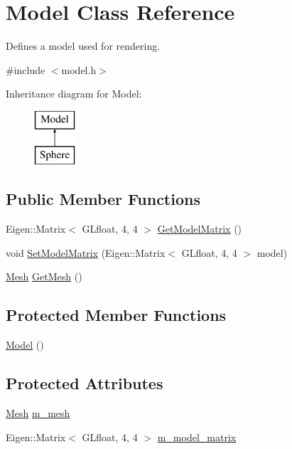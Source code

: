 \hypertarget{classModel}{}\section{Model Class Reference}
\label{classModel}


Defines a model used for rendering.  




{\ttfamily \#include $<$model.\+h$>$}

Inheritance diagram for Model\+:\begin{figure}[H]
\begin{center}
\leavevmode
\includegraphics[height=2.000000cm]{classModel}
\end{center}
\end{figure}
\subsection*{Public Member Functions}
\begin{DoxyCompactItemize}
\item 
Eigen\+::\+Matrix$<$ G\+Lfloat, 4, 4 $>$ \hyperlink{classModel_af37e550b25274838de666ddc7e2167d6}{Get\+Model\+Matrix} ()
\item 
void \hyperlink{classModel_a6b79c9e0c9abc50896e70fe1fabff4e7}{Set\+Model\+Matrix} (Eigen\+::\+Matrix$<$ G\+Lfloat, 4, 4 $>$ model)
\item 
\hyperlink{classMesh}{Mesh} \hyperlink{classModel_a332f5a4ecf9bca582e583b3ff7784bf5}{Get\+Mesh} ()
\end{DoxyCompactItemize}
\subsection*{Protected Member Functions}
\begin{DoxyCompactItemize}
\item 
\hyperlink{classModel_ae3b375de5f6df4faf74a95d64748e048}{Model} ()
\end{DoxyCompactItemize}
\subsection*{Protected Attributes}
\begin{DoxyCompactItemize}
\item 
\hyperlink{classMesh}{Mesh} \hyperlink{classModel_afe425f579d17b798e6c454a5c5e2d952}{m\+\_\+mesh}
\item 
Eigen\+::\+Matrix$<$ G\+Lfloat, 4, 4 $>$ \hyperlink{classModel_a41d60873613f3b75c8242df3bbb44ca9}{m\+\_\+model\+\_\+matrix}
\end{DoxyCompactItemize}


